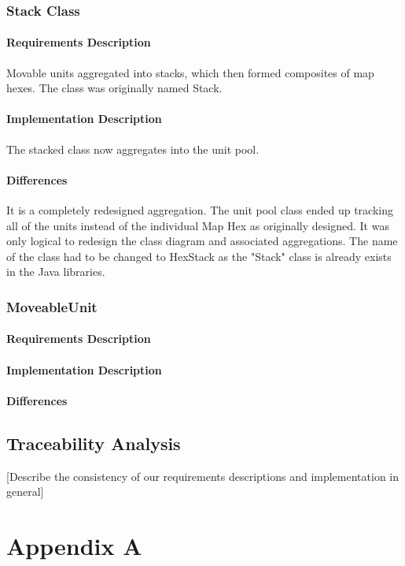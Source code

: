 \documentclass[12pt,a4paper,titlepage]{article}
\begin{document}
\subsubsection{Stack Class} 
\paragraph{Requirements Description} Movable units aggregated into stacks, which then formed composites of map hexes. The class was originally named Stack.
\paragraph{Implementation Description} The stacked class now aggregates into the unit pool.
\paragraph{Differences} It is a completely redesigned aggregation.  The unit pool class ended up tracking all of the units instead of the individual Map Hex as originally designed.  It was only logical to redesign the class diagram and associated aggregations. The name of the class had to be changed to HexStack as the "Stack" class is already exists in the Java libraries.

\subsubsection{MoveableUnit}
\paragraph{Requirements Description} 
\paragraph{Implementation Description}
\paragraph{Differences}

\subsection{Traceability Analysis}
[Describe the consistency of our requirements descriptions and implementation in general]

\section{Appendix A}
\end{document}
